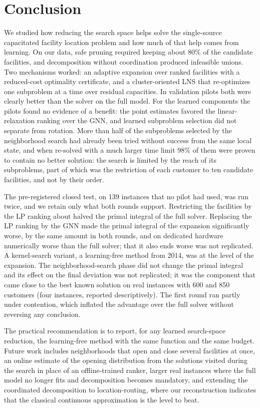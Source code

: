 \section{Conclusion}\label{sec:conclusion}

We studied how reducing the search space helps solve the single-source capacitated facility
location problem and how much of that help comes from learning. On our data, safe pruning
required keeping about 80\% of the candidate facilities, and decomposition without coordination
produced infeasible unions. Two mechanisms worked: an adaptive expansion over ranked facilities
with a reduced-cost optimality certificate, and a cluster-oriented LNS that re-optimizes one
subproblem at a time over residual capacities. In validation pilots both were clearly better than
the solver on the full model. For the learned components the pilots found no evidence of a benefit: the point estimates
favored the linear-relaxation ranking over the GNN, and learned subproblem selection did not
separate from rotation.
More than half of the subproblems selected by the neighborhood search had already been tried
without success from the same local state, and when re-solved with a much larger time limit 98\%
of them were proven to contain no better solution: the search is limited by the reach of its
subproblems, part of which was the restriction of each customer to ten candidate facilities, and
not by their order.

The pre-registered closed test, on 139 instances that no pilot had used, was run twice, and
we retain only what both rounds support. Restricting the facilities by the LP ranking about
halved the primal integral of the full solver. Replacing the LP ranking by the GNN made the
primal integral of the expansion significantly worse, by the same amount in both rounds, and on
dedicated hardware numerically worse than the full solver; that it also ends worse was not replicated. A
kernel-search variant, a learning-free method from 2014, was at the level of the expansion. The
neighborhood-search phase did not change the primal integral and its effect on the final
deviation was not replicated; it was the component that came close to the best known solution on
real instances with 600 and 850 customers (four instances, reported descriptively). The first
round ran partly under contention, which inflated the advantage over the full solver without
reversing any conclusion.

The practical recommendation is to report, for any learned search-space reduction, the
learning-free method with the same function and the same budget. Future work includes
neighborhoods that open and close several facilities at once, an online estimate of the opening
distribution from the solutions visited during the search in place of an offline-trained ranker,
larger real instances where the full model no longer fits and decomposition becomes mandatory,
and extending the coordinated decomposition to location-routing, where our reconstruction
indicates that the classical continuous approximation is the level to beat.
